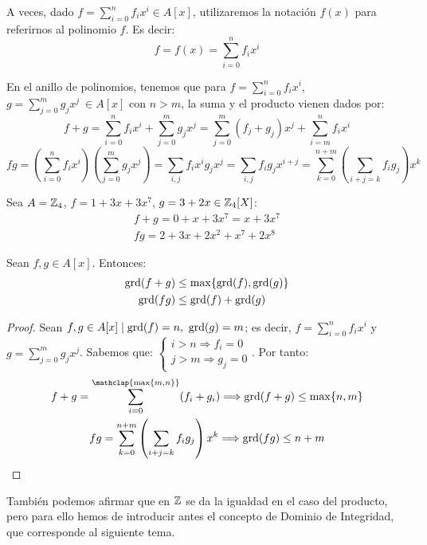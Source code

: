 \begin{notacion}
    A veces, dado $f=\sum\limits_{i=0}^n f_i x^i \in A[x]$, utilizaremos la notación $f(x)$ para referirnos al polinomio $f$. Es decir:
    $$f = f(x) = \sum_{i=0}^n f_i x^i$$
\end{notacion}

En el anillo de polinomios, tenemos que para $f = \sum\limits_{i=0}^n f_i x^i$, $g = \sum\limits_{j=0}^m g_j x^j ~\in A[x]$ con $n > m$, la suma y el producto vienen dados por:
\begin{equation*}
    f+g = \sum\limits_{i=0}^n f_i x^i + \sum\limits_{j=0}^m g_j x^j = \sum_{j=0}^m (f_j + g_j)x^j + \sum_{i=m}^n f_i x^i
\end{equation*}
\begin{equation*}
    fg = \left(\sum\limits_{i=0}^n f_i x^i \right) \left( \sum\limits_{j=0}^m g_j x^j\right) = \sum_{i,j} f_i x^i g_j x^j = \sum_{i,j} f_i g_j x^{i+j} = \sum_{k=0}^{n+m} \left( \sum_{i+j=k} f_i g_j \right) x^k
\end{equation*}

\begin{ejemplo}
    Sea $A = \mathbb Z_4$, $f = 1 + 3x + 3x^7$, $g=3+2x \in \mathbb Z_4[X]$:
    \begin{gather*}
        f+g = 0 + x + 3x^7 = x + 3x^7\\
        fg = 2 + 3x + 2x^2 + x^7 + 2x^8
    \end{gather*}
\end{ejemplo}

\begin{prop}
    Sean $f,g \in A[x]$. Entonces:
    \begin{align*}
        \operatorname{grd}(f+g) &\leq \max\{\operatorname{grd}(f), \operatorname{grd}(g)\} \\
        \operatorname{grd}(fg) &\leq \operatorname{grd}(f) + \operatorname{grd}(g)
    \end{align*}
\end{prop}
\begin{proof}
    Sean $f,g \in A[x] \mid \operatorname{grd}(f) = n,~\operatorname{grd}(g) = m$; es decir, $f = \sum\limits_{i=0}^n f_ix^i$ y $g=\sum\limits_{j=0}^m g_j x^j$. Sabemos que: 
        $\left\{\begin{array}{c}
            i>n \Longrightarrow f_i=0\\
            j>m \Longrightarrow g_j=0
        \end{array}\right.$. Por tanto:
    \begin{multline*}
        f+g = \sum_{i=0}^{\mathclap{\max\{m,n\}}} (f_i+g_i) \Longrightarrow \grd(f+g) \leq \max\{n,m\}\\
        fg = \sum_{k=0}^{n+m} \left( \sum_{i+j=k} f_ig_j \right)x^k \Longrightarrow \grd(fg) \leq n+m
    \end{multline*}
\end{proof}
También podemos afirmar que en $\mathbb Z$ se da la igualdad en el caso del producto, pero para ello hemos de introducir antes el concepto de Dominio de Integridad, que corresponde al siguiente tema.

